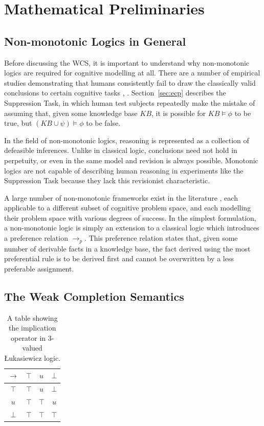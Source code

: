 \documentclass{article}
\begin{document}
\section{Mathematical Preliminaries}
\subsection{Non-monotonic Logics in General}

Before discussing the WCS, it is important to understand why non-monotonic logics are required for cognitive modelling at all. There are a number of empirical studies demonstrating that humans consistently fail to draw the classically valid conclusions to certain cognitive tasks \citep{byrne1989suppressing}, \citep{wason1968reasoning}. Section~\ref{sec:ecp} describes the Suppression Task, in which human test subjects repeatedly make the mistake of assuming that, given some knowledge base $KB$, it is possible for $KB \models \phi$ to be true, but $(KB \cup \psi) \models \phi$ to be false.

In the field of non-monotonic logics, reasoning is represented as a collection of defeasible inferences. Unlike in classical logic, conclusions need not hold in perpetuity, or even in the same model and revision is always possible. Monotonic logics are not capable of describing human reasoning in experiments like the Suppression Task \citep{dietz2012computational} because they lack this revisionist characteristic.

A large number of non-monotonic frameworks exist in the literature \citep{mcdermott1980non}, each applicable to a different subset of cognitive problem space, and each modelling their problem space with various degrees of success. In the simplest formulation, a non-monotonic logic is simply an extension to a classical logic which introduces a preference relation $\rightarrow_p$. This preference relation states that, given some number of derivable facts in a knowledge base, the fact derived using the most preferential rule is to be derived first and cannot be overwritten by a less preferable assignment.


\subsection{The Weak Completion Semantics}

\begin{table}
\begin{center}


\begin{tabular}{ c | c c c }
  $\rightarrow$& $\top$ & $u$ & $\bot$ \\ \hline
 $\top$ & $\top$ & $u$ & $\bot$ \\  
 $u$ & $\top$ & $\top$ & $u$\\  
 $\bot$ & $\top$ & $\top$ & $\top$
\end{tabular}
\caption{A table showing the implication operator in 3-valued \L ukasiewicz logic.}
\label{tbl:luk}

\end{center}
\end{table}
\end{document}
